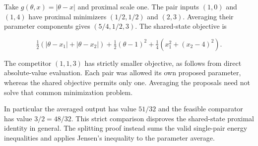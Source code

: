 \documentclass[11pt,a4paper]{article}
\begin{document}
Take \(g(\theta,x)=|\theta-x|\) and proximal scale one. The pair inputs \((1,0)\) and \((1,4)\) have proximal minimizers \((1/2,1/2)\) and \((2,3)\). Averaging their parameter components gives \((5/4,1/2,3)\). The shared-state objective is

\[\tfrac12(|\theta-x_1|+|\theta-x_2|)+\tfrac12(\theta-1)^2+\tfrac14(x_1^2+(x_2-4)^2).\]

The competitor \((1,1,3)\) has strictly smaller objective, as follows from direct absolute-value evaluation. Each pair was allowed its own proposed parameter, whereas the shared objective permits only one. Averaging the proposals need not solve that common minimization problem.



In particular the averaged output has value \(51/32\) and the feasible comparator has value \(3/2=48/32\). This strict comparison disproves the shared-state proximal identity in general. The splitting proof instead sums the valid single-pair energy inequalities and applies Jensen’s inequality to the parameter average.
\end{document}
